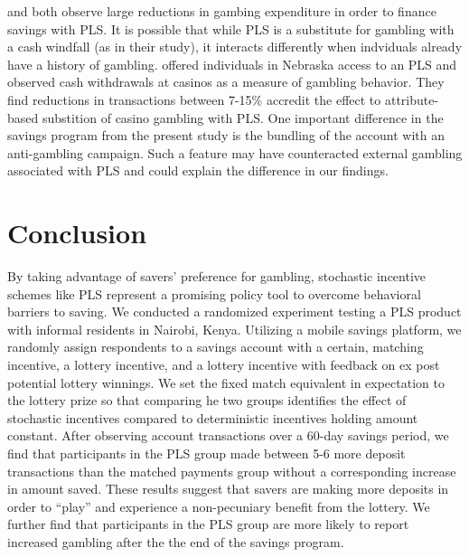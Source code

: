 \documentclass[11pt]{article}
\begin{document}
		\textcite{atalay_savings_2014} and \textcite{dizon_leveraging_2016} both observe large reductions in gambing expenditure in order to finance savings with PLS. It is possible that while PLS is a substitute for gambling with a cash windfall (as in their study), it interacts differently when indviduals already have a history of gambling. \textcite{cookson_when_2016} offered individuals in Nebraska access to an PLS and observed cash withdrawals at casinos as a measure of gambling behavior. They find reductions in transactions between 7-15\% accredit the effect to attribute-based substition of casino gambling with PLS. One important difference in the savings program from the present study is the bundling of the account with an anti-gambling campaign. Such a feature may have counteracted external gambling associated with PLS and could explain the difference in our findings.

		

\section{Conclusion} \label{sec:conclusion}

		By taking advantage of savers' preference for gambling, stochastic incentive schemes like PLS represent a promising policy tool to overcome behavioral barriers to saving. We conducted a randomized experiment testing a PLS product with informal residents in Nairobi, Kenya. Utilizing a mobile savings platform, we randomly assign respondents to a savings account with a certain, matching incentive, a lottery incentive, and a lottery incentive with feedback on ex post potential lottery winnings. We set the fixed match equivalent in expectation to the lottery prize so that comparing he two groups identifies the effect of stochastic incentives compared to deterministic incentives holding amount constant. After observing account transactions over a 60-day savings period, we find that participants in the PLS group made between 5-6 more deposit transactions than the matched payments group without a corresponding increase in amount saved. These results suggest that savers are making more deposits in order to ``play'' and experience a non-pecuniary benefit from the lottery. We further find that participants in the PLS group are more likely to report increased gambling after the the end of the savings program.
\end{document}
